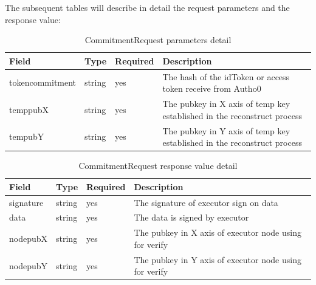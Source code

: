 \documentclass[../Main.tex]{subfiles}
\begin{document}
The subsequent tables will describe in detail the request parameters and the response value:
\begin{table}[H]
  \centering
  \begin{tabular}{|l|l|l|p{8cm}|}
\hline
\rowcolor[HTML]{F56B00} 
\textbf{Field}  & \textbf{Type} & \textbf{Required} & \textbf{Description}                                                    \\ \hline
tokencommitment & string        & yes               & The hash of the idToken or access token receive from Autho0             \\ \hline
temppubX        & string        & yes               & The pubkey in X axis of temp key established in the reconstruct process \\ \hline
tempubY         & string        & yes               & The pubkey in Y axis of temp key established in the reconstruct process \\ \hline
\end{tabular}
  \caption{CommitmentRequest parameters detail}
  \label{commitmentrequest-params-detail}
\end{table}

\begin{table}[H]
  \centering
  \begin{tabular}{|l|l|l|p{8cm}|}
\hline
\rowcolor[HTML]{F56B00} 
\textbf{Field} & \textbf{Type} & \textbf{Required} & \textbf{Description}                                   \\ \hline
signature      & string        & yes               & The signature of executor sign on data                 \\ \hline
data           & string        & yes               & The data is signed by executor                         \\ \hline
nodepubX       & string        & yes               & The pubkey in X axis of executor node using for verify \\ \hline
nodepubY       & string        & yes               & The pubkey in Y axis of executor node using for verify \\ \hline
\end{tabular}
  \caption{CommitmentRequest response value detail}
  \label{commitmentrequest-response-detail}
\end{table}
\end{document}
